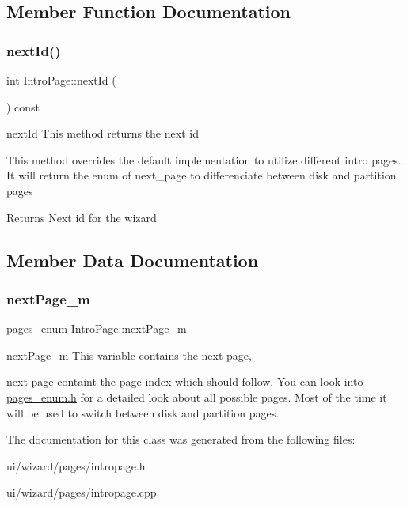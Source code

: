 \subsection{Member Function Documentation}
\mbox{\label{class_intro_page_a210708d731eaca79e5c0d220c08ad739}} 
\subsubsection{\texorpdfstring{next\+Id()}{nextId()}}
{\footnotesize\ttfamily int Intro\+Page\+::next\+Id (\begin{DoxyParamCaption}{ }\end{DoxyParamCaption}) const\hspace{0.3cm}{\ttfamily [override]}}



next\+Id This method returns the next id 

This method overrides the default implementation to utilize different intro pages. It will return the enum of next\+\_\+page to differenciate between disk and partition pages \begin{DoxyReturn}{Returns}
Next id for the wizard 
\end{DoxyReturn}


\subsection{Member Data Documentation}
\mbox{\label{class_intro_page_a49cf6740852e8847bb3d9db3106e5d65}} 
\subsubsection{\texorpdfstring{next\+Page\+\_\+m}{nextPage\_m}}
{\footnotesize\ttfamily pages\+\_\+enum Intro\+Page\+::next\+Page\+\_\+m\hspace{0.3cm}{\ttfamily [private]}}



next\+Page\+\_\+m This variable contains the next page, 

next page containt the page index which should follow. You can look into \mbox{\hyperlink{pages__enum_8h_source}{pages\+\_\+enum.\+h}} for a detailed look about all possible pages. Most of the time it will be used to switch between disk and partition pages. 

The documentation for this class was generated from the following files\+:\begin{DoxyCompactItemize}
\item 
ui/wizard/pages/intropage.\+h\item 
ui/wizard/pages/intropage.\+cpp\end{DoxyCompactItemize}
